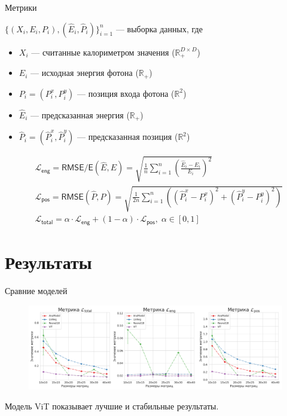 \documentclass[9pt]{beamer}
\begin{document}
\begin{frame}{Метрики}
    \begin{block}{}
        $\{(X_i, E_i, P_i), (\widehat{E}_i, \widehat{P}_i) \}_{i = 1}^{n}$ --- выборка данных, где \begin{itemize}
            \item $X_i$ --- считанные калориметром значения ($\mathbb{R}_{+}^{D \times D}$)
            \item $E_i$ --- исходная энергия фотона ($\mathbb{R}_{+}$)
            \item $P_i = (P_i^x, P_i^y)$ --- позиция входа фотона ($\mathbb{R}^2$)
            \item $\widehat{E}_i$ --- предсказанная энергия ($\mathbb{R}_{+}$)
            \item $\widehat{P}_i = (\widehat{P}_i^x, \widehat{P}_i^y)$ --- предсказанная позиция ($\mathbb{R}^2$)
        \end{itemize}
    \end{block}

    \begin{block}{}
        \begin{align*}
            &\mathcal{L}_{\mathsf{eng}} = \textsf{RMSE/E}(\widehat{E}, E) = \sqrt{\frac{1}{n} \sum_{i = 1}^{n} \left( \frac{\widehat{E}_i - E_i}{E_i} \right)^2} \\
            &\mathcal{L}_{\mathsf{pos}} = \textsf{RMSE}(\widehat{P}, P) = \sqrt{\frac{1}{2 n} \sum_{i = 1}^{n} \left( (\widehat{P}_i^x - P_i^x)^2 + (\widehat{P}_i^y - P_i^y)^2 \right)} \\
            &\mathcal{L}_{\mathsf{total}} = \alpha \cdot \mathcal{L}_{\mathsf{eng}} + (1 - \alpha) \cdot \mathcal{L}_{\mathsf{pos}} , \; \alpha \in [0, 1]
        \end{align*}
    \end{block}
\end{frame}

\section{Результаты}

\begin{frame}{Сравние моделей}
    \begin{figure}
        \centering
        \includegraphics[width=1.0\textwidth]{../report/graphics/models_comp.png}
    \end{figure}

    \begin{block}{}
        Модель ViT показывает лучшие и стабильные результаты.
    \end{block}
\end{frame}
\end{document}
